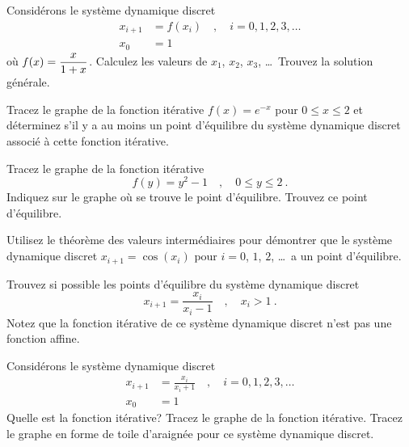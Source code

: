 \begin{question}[\life]
Considérons le système dynamique discret
\begin{align*}
x_{i+1} &= f(x_i) \quad , \quad i=0, 1, 2, 3, \ldots \\
x_0 &= 1
\end{align*}
où $\displaystyle f(x) = \frac{x}{1+x}$.  Calculez les valeurs de $x_1$,
$x_2$, $x_3$, \ldots \ Trouvez la solution générale.
\label{6Q92}
\end{question}

\begin{question}[\life]
Tracez le graphe de la fonction itérative $f(x) = e^{-x}$ pour
$0 \leq x \leq 2$ et déterminez s'il y a au moins un point d'équilibre
du système dynamique discret associé à cette fonction itérative.
\label{6Q93}
\end{question}

\begin{question}[\life]
Tracez le graphe de la fonction itérative
\[
f(y) = y^2 -1 \quad , \quad 0 \leq y \leq 2 \ .
\]
Indiquez sur le graphe où se trouve le point d'équilibre.  Trouvez ce
point d'équilibre.
\label{6Q94}
\end{question}

\begin{question}[\life]
Utilisez le théorème des valeurs intermédiaires pour démontrer que le système
dynamique discret $x_{i+1} = \cos(x_i)$ pour $i=0$, $1$, $2$, \ldots\ a un
point d'équilibre.
\label{6Q95}
\end{question}

\begin{question}[\life]
Trouvez si possible les points d'équilibre du système dynamique discret
\[
x_{i+1} = \frac{x_i}{x_i-1}  \quad , \quad x_i > 1 \ .
\]
Notez que la fonction itérative de ce système dynamique discret n'est
pas une fonction affine.
\label{6Q96}
\end{question}

\begin{question}[\life]
Considérons le système dynamique discret
\begin{align*}
x_{i+1} &= \frac{x_i}{x_i +1}  \quad , \quad i=0, 1, 2, 3, \ldots \\
x_0 &= 1
\end{align*}
Quelle est la fonction itérative?  Tracez le graphe de la fonction
itérative.  Tracez le graphe en forme de toile d'araignée pour ce système
dynamique discret.
\label{6Q97}
\end{question}

